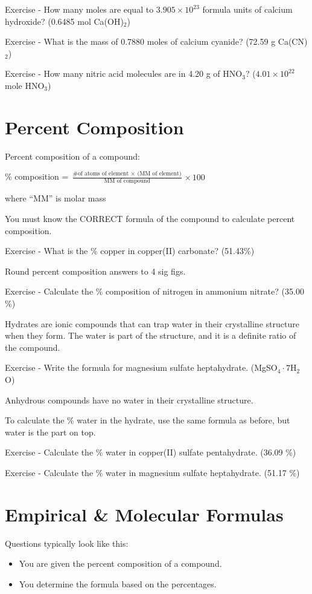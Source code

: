 \documentclass[../hchem.tex]{subfiles}
\begin{document}
Exercise - How many moles are equal to $3.905\times 10^{23}$ formula units of calcium hydroxide? (0.6485 mol Ca(OH)$_2$)

Exercise - What is the mass of 0.7880 moles of calcium cyanide? (72.59 g Ca(CN)$_2$)

Exercise - How many nitric acid molecules are in 4.20 g of HNO$_3$? ($4.01\times10^{22}$ mole HNO$_3$)

\section{Percent Composition}
Percent composition of a compound:
\begin{center}
    \% composition = $\frac{\text{\# of atoms of element $\times$ (MM of element)}}{\text{MM of compound}}\times 100$

    where ``MM'' is molar mass 
\end{center}

You must know the CORRECT formula of the compound to calculate percent composition.

Exercise - What is the \% copper in copper(II) carbonate? (51.43\%)

Round percent composition answers to 4 sig figs.

Exercise - Calculate the \% composition of nitrogen in ammonium nitrate? (35.00 \%)

Hydrates are ionic compounds that can trap water in their crystalline structure when they form. The water is part of the structure, and it is a definite ratio of the compound.

Exercise - Write the formula for magnesium sulfate heptahydrate. (MgSO$_4\cdot7$H$_2$O)

Anhydrous compounds have no water in their crystalline structure.

To calculate the \% water in the hydrate, use the same formula as before, but water is the part on top.

Exercise - Calculate the \% water in copper(II) sulfate pentahydrate. (36.09 \%)

Exercise - Calculate the \% water in magnesium sulfate heptahydrate. (51.17 \%)
\section{Empirical \& Molecular Formulas}
Questions typically look like this: 
\begin{itemize}
    \item You are given the percent composition of a compound.
    \item You determine the formula based on the percentages.
\end{itemize}
\end{document}
